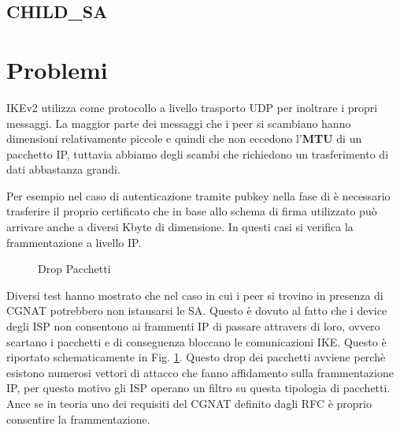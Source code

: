 \subsection{CHILD\_SA}

\newpage
\section{Problemi}

IKEv2 utilizza come protocollo a livello trasporto UDP per inoltrare i propri messaggi. La maggior parte dei messaggi che i peer si scambiano hanno dimensioni relativamente piccole e
quindi che non eccedono l'\textbf{MTU} di un pacchetto IP, tuttavia abbiamo degli scambi che richiedono un trasferimento di dati abbastanza grandi.

Per esempio nel caso di autenticazione tramite pubkey nella fase di  è necessario trasferire il proprio certificato che in base allo schema di firma utilizzato
può arrivare anche a diversi Kbyte di dimensione. In questi casi si verifica la frammentazione a livello IP.


\begin{figure}[htbp]
    \centering
    \vspace*{1cm}
    \caption{Drop Pacchetti}
    \label{fig:cgnatdrop}
\end{figure}

Diversi test hanno mostrato che nel caso in cui i peer si trovino in presenza di CGNAT potrebbero non istausarsi le SA. Questo è dovuto al fatto che i device degli ISP non
consentono ai frammenti IP di passare attravers di loro, ovvero scartano i pacchetti e di conseguenza bloccano le comunicazioni IKE.
Questo è riportato schematicamente in Fig. \ref{fig:cgnatdrop}.
Questo drop dei pacchetti avviene perchè esistono numerosi vettori di attacco che fanno affidamento sulla frammentazione IP, per questo motivo gli ISP operano un filtro su questa tipologia di pacchetti.
Ance se in teoria uno dei requisiti del CGNAT definito dagli RFC è proprio consentire la frammentazione.


